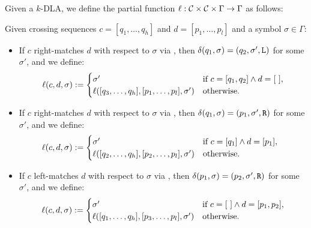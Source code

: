 \begin{defn}
	Given a $k$-DLA, we define the partial function $\ell:\mathcal C\times\mathcal C\times\Gamma\to\Gamma$ as follows:

	Given crossing sequences $c=[q_1,\dots,q_h]$ and $d=[p_1,\dots,p_l]$ and a symbol $\sigma\in\Gamma$:
	\begin{itemize}
		\item If $c$ right-matches $d$ with respect to $\sigma$ via , then $\delta(q_1,\sigma)=(q_2,\sigma',\mathtt L)$ for some $\sigma'$, and we define:
		      \begin{equation*}
			      \ell(c,d,\sigma):=\begin{cases}
				      \sigma'                                        & \text{if } c=[q_1,q_2]\land d=[~], \\
				      \ell([q_3,\dots,q_h],[p_1,\dots,p_l],\sigma') & \text{otherwise}.
			      \end{cases}
		      \end{equation*}
		\item If $c$ right-matches $d$ with respect to $\sigma$ via , then $\delta(q_1,\sigma)=(p_1,\sigma',\mathtt R)$ for some $\sigma'$, and we define:
		      \begin{equation*}
			      \ell(c,d,\sigma):=\begin{cases}
				      \sigma'                                        & \text{if } c=[q_1]\land d=[p_1],~~ \\
				      \ell([q_2,\dots,q_h],[p_2,\dots,p_l],\sigma') & \text{otherwise}.
			      \end{cases}
		      \end{equation*}
		\item If $c$ left-matches $d$ with respect to $\sigma$ via , then $\delta(p_1,\sigma)=(p_2,\sigma',\mathtt R)$ for some $\sigma'$, and we define:
		      \begin{equation*}
			      \ell(c,d,\sigma):=\begin{cases}
				      \sigma'                                        & \text{if } c=[~]\land d=[p_1,p_2], \\
				      \ell([q_1,\dots,q_h],[p_3,\dots,p_l],\sigma') & \text{otherwise}.
			      \end{cases}
		      \end{equation*}

\end{itemize}
\end{defn}
